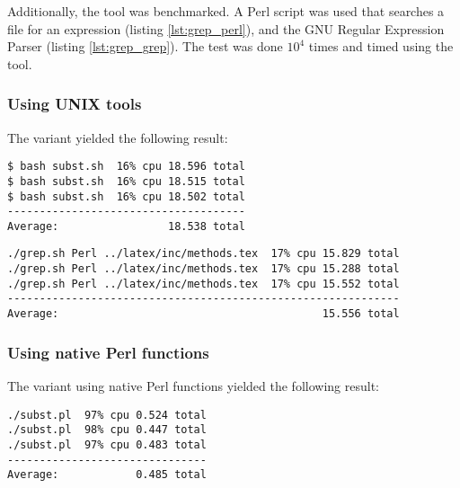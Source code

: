 Additionally, the  tool was benchmarked. A Perl script was used that searches a file for an expression (listing \ref{lst:grep_perl}), and the GNU Regular Expression Parser  (listing \ref{lst:grep_grep}). The test was done $10^4$ times and timed using the  tool.

\subsubsection{Using UNIX tools}


The  variant yielded the following result:

\begin{verbatim}
$ bash subst.sh  16% cpu 18.596 total
$ bash subst.sh  16% cpu 18.515 total
$ bash subst.sh  16% cpu 18.502 total
-------------------------------------
Average:                 18.538 total
\end{verbatim}



\begin{verbatim}
./grep.sh Perl ../latex/inc/methods.tex  17% cpu 15.829 total
./grep.sh Perl ../latex/inc/methods.tex  17% cpu 15.288 total
./grep.sh Perl ../latex/inc/methods.tex  17% cpu 15.552 total
-------------------------------------------------------------
Average:                                         15.556 total
\end{verbatim}

\subsubsection{Using native Perl functions}


The variant using native Perl functions yielded the following result:

\begin{verbatim}
./subst.pl  97% cpu 0.524 total
./subst.pl  98% cpu 0.447 total
./subst.pl  97% cpu 0.483 total
-------------------------------
Average:            0.485 total
\end{verbatim}



